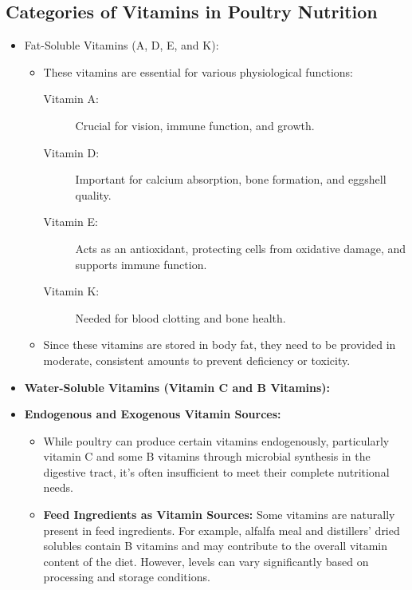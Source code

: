 \documentclass[a4paper,12pt]{article}
\begin{document}
\subsection{Categories of Vitamins in Poultry Nutrition}
\begin{itemize}
	\item Fat-Soluble Vitamins (A, D, E, and K):
	\begin{itemize}
		\item These vitamins are essential for various physiological functions:
			\begin{description}
				\item[Vitamin A:] Crucial for vision, immune function, and growth.
				\item[Vitamin D:] Important for calcium absorption, bone formation, and eggshell quality.
				\item[Vitamin E:] Acts as an antioxidant, protecting cells from oxidative damage, and supports immune function.
				\item[Vitamin K:] Needed for blood clotting and bone health.
			\end{description}
		\item Since these vitamins are stored in body fat, they need to be provided in
moderate, consistent amounts to prevent deficiency or toxicity.
	\end{itemize}
	
	\item \textbf{Water-Soluble Vitamins (Vitamin C and B Vitamins):}
		
	\item \textbf{Endogenous and Exogenous Vitamin Sources:}
		\begin{itemize}
			\item While poultry can produce certain vitamins endogenously, particularly vitamin C and some B vitamins through microbial synthesis in the digestive tract, it’s often
insufficient to meet their complete nutritional needs.
			\item \textbf{Feed Ingredients as Vitamin Sources:} Some vitamins are naturally present in feed ingredients. For example, alfalfa meal and distillers' dried solubles contain B vitamins and may contribute to the overall vitamin content of the diet. However,
levels can vary significantly based on processing and storage conditions.
		\end{itemize}
		

\end{itemize}
\end{document}
